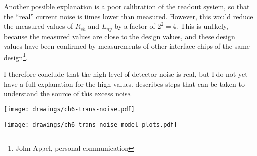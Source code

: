 Another possible explanation is a poor calibration of the readout system, so that the ``real'' current noise is  times lower than measured.
However, this would reduce the measured values of $R_{sh}$ and $L_{ny}$ by a factor of $2^2=4$.
This is unlikely, because the measured values are close to the design values, and these design values have been confirmed by measurements of other interface chips of the same design\footnote{John Appel, personal communication}.

I therefore conclude that the high level of detector noise is real, but I do not yet have a full explanation for the high values.
 describes steps that can be taken to understand the source of this excess noise.

\begin{figure*}
  \centering
\texttt{[image: drawings/ch6-trans-noise.pdf]}
\caption[Detector noise measurements]{
Plots showing detector noise for the four detectors with working heaters on column 0.
The left column plots the directly measured current noise, after removing a common mode signal, at eight bias values from 25k to 32k.
The right column shows the same noise spectra, but referred to power absorbed in the bolometer.
For all four detectors, there is less spread in the low-frequency power noise than in the current noise, suggesting that the dominant source of noise at these frequencies deposits power on the bolometers.
This behavior is expected of either thermal fluctuation noise or photon noise.
Also plotted in the right column is the predicted noise spectrum, using parameters taken from , including  of photon noise.
For all four detectors, the measured noise is higher than predicted by the noise model.
}
\label{fig:ch6-trans-noise}
\end{figure*}

\begin{figure*}
  \centering
\texttt{[image: drawings/ch6-trans-noise-model-plots.pdf]}
\caption[Measured and modeled noise]{
  Plot showing measured noise for , referred to power absorbed in bolometer, along with two noise models.
The red line is the basic detector noise model using measured values for all detector parameters as described in this chapter, including predicted  of photon noise.
The black line is for a noise model that include enough excess ``power'' noise to match the measured white noise level at low frequencies.
This excess ``power'' noise could be due to a high level of photon noise (1.9 times higher than predicted) or a larger-than-measured value of $G$ (4.8 times higher than measured), or some combination of the two.
}
\label{fig:ch6-trans-noise-model-plots}
\end{figure*}

